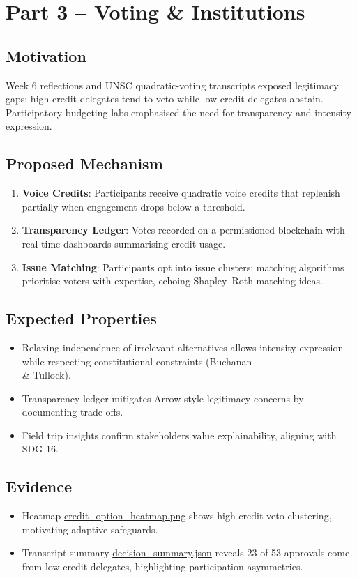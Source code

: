 \documentclass[11pt]{article}
\begin{document}
\section{Part 3 -- Voting \& Institutions}
\subsection{Motivation}
Week 6 reflections and UNSC quadratic-voting transcripts exposed legitimacy gaps: high-credit delegates tend to veto while low-credit delegates abstain. Participatory budgeting labs emphasised the need for transparency and intensity expression.

\subsection{Proposed Mechanism}
\begin{enumerate}[leftmargin=*]
  \item \textbf{Voice Credits}: Participants receive quadratic voice credits that replenish partially when engagement drops below a threshold.
  \item \textbf{Transparency Ledger}: Votes recorded on a permissioned blockchain with real-time dashboards summarising credit usage.
  \item \textbf{Issue Matching}: Participants opt into issue clusters; matching algorithms prioritise voters with expertise, echoing Shapley--Roth matching ideas.
\end{enumerate}

\subsection{Expected Properties}
\begin{itemize}[leftmargin=*]
  \item Relaxing independence of irrelevant alternatives allows intensity expression while respecting constitutional constraints (Buchanan \\& Tullock).
  \item Transparency ledger mitigates Arrow-style legitimacy concerns by documenting trade-offs.
  \item Field trip insights confirm stakeholders value explainability, aligning with SDG 16.
\end{itemize}

\subsection{Evidence}
\begin{itemize}[leftmargin=*]
  \item Heatmap \href{../visualizations/voting/credit_option_heatmap.png}{credit\_option\_heatmap.png} shows high-credit veto clustering, motivating adaptive safeguards.
  \item Transcript summary \href{../visualizations/voting/decision_summary.json}{decision\_summary.json} reveals 23 of 53 approvals come from low-credit delegates, highlighting participation asymmetries.
\end{itemize}
\end{document}
